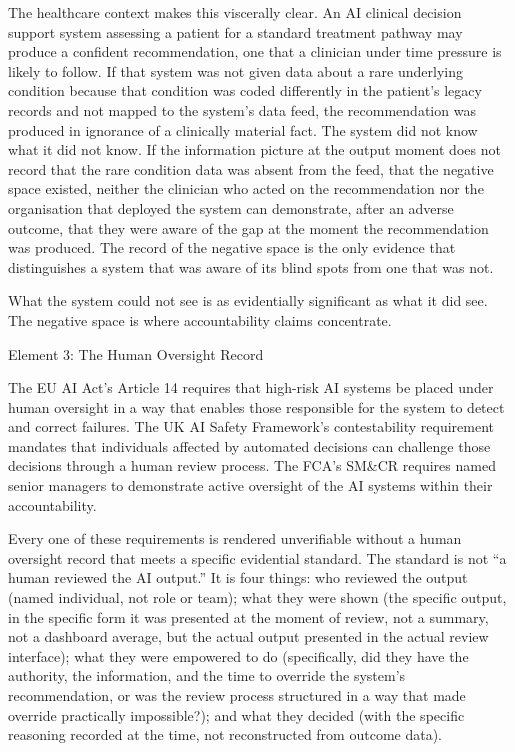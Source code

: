 The healthcare context makes this viscerally clear. An AI clinical decision support system assessing a patient for a standard treatment pathway may produce a confident recommendation, one that a clinician under time pressure is likely to follow. If that system was not given data about a rare underlying condition because that condition was coded differently in the patient's legacy records and not mapped to the system's data feed, the recommendation was produced in ignorance of a clinically material fact. The system did not know what it did not know. If the information picture at the output moment does not record that the rare condition data was absent from the feed, that the negative space existed, neither the clinician who acted on the recommendation nor the organisation that deployed the system can demonstrate, after an adverse outcome, that they were aware of the gap at the moment the recommendation was produced. The record of the negative space is the only evidence that distinguishes a system that was aware of its blind spots from one that was not.

What the system could not see is as evidentially significant as what it did see. The negative space is where accountability claims concentrate.

Element 3: The Human Oversight Record

The EU AI Act's Article 14 requires that high-risk AI systems be placed under human oversight in a way that enables those responsible for the system to detect and correct failures. The UK AI Safety Framework's contestability requirement mandates that individuals affected by automated decisions can challenge those decisions through a human review process. The FCA's SM\&CR requires named senior managers to demonstrate active oversight of the AI systems within their accountability.

Every one of these requirements is rendered unverifiable without a human oversight record that meets a specific evidential standard. The standard is not ``a human reviewed the AI output.'' It is four things: who reviewed the output (named individual, not role or team); what they were shown (the specific output, in the specific form it was presented at the moment of review, not a summary, not a dashboard average, but the actual output presented in the actual review interface); what they were empowered to do (specifically, did they have the authority, the information, and the time to override the system's recommendation, or was the review process structured in a way that made override practically impossible?); and what they decided (with the specific reasoning recorded at the time, not reconstructed from outcome data).


